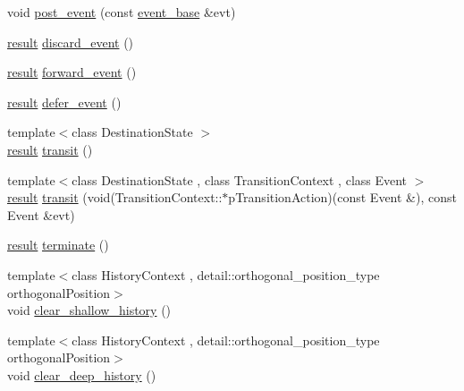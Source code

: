 \begin{DoxyCompactItemize}
\item 
void \mbox{\hyperlink{classboost_1_1statechart_1_1simple__state_aeea3396289a32b467dd094d2c7965f23}{post\+\_\+event}} (const \mbox{\hyperlink{classboost_1_1statechart_1_1event__base}{event\+\_\+base}} \&evt)
\item 
\mbox{\hyperlink{namespaceboost_1_1statechart_abe807f6598b614d6d87bb951ecd92331}{result}} \mbox{\hyperlink{classboost_1_1statechart_1_1simple__state_aba633726b29a7bd07d69429bab4a3a1b}{discard\+\_\+event}} ()
\item 
\mbox{\hyperlink{namespaceboost_1_1statechart_abe807f6598b614d6d87bb951ecd92331}{result}} \mbox{\hyperlink{classboost_1_1statechart_1_1simple__state_a9892a580bc7f9b502e5c01970bff17cf}{forward\+\_\+event}} ()
\item 
\mbox{\hyperlink{namespaceboost_1_1statechart_abe807f6598b614d6d87bb951ecd92331}{result}} \mbox{\hyperlink{classboost_1_1statechart_1_1simple__state_aa2d6f620620d43f7db68baa9ed638b80}{defer\+\_\+event}} ()
\item 
{\footnotesize template$<$class Destination\+State $>$ }\\\mbox{\hyperlink{namespaceboost_1_1statechart_abe807f6598b614d6d87bb951ecd92331}{result}} \mbox{\hyperlink{classboost_1_1statechart_1_1simple__state_aa0865d4f3f3763e77dfd86f70aa558af}{transit}} ()
\item 
{\footnotesize template$<$class Destination\+State , class Transition\+Context , class Event $>$ }\\\mbox{\hyperlink{namespaceboost_1_1statechart_abe807f6598b614d6d87bb951ecd92331}{result}} \mbox{\hyperlink{classboost_1_1statechart_1_1simple__state_a8afd3e06eb91829a43bc82031c848fb1}{transit}} (void(Transition\+Context\+::$\ast$p\+Transition\+Action)(const Event \&), const Event \&evt)
\item 
\mbox{\hyperlink{namespaceboost_1_1statechart_abe807f6598b614d6d87bb951ecd92331}{result}} \mbox{\hyperlink{classboost_1_1statechart_1_1simple__state_af1b306e54db708323280093a4452da13}{terminate}} ()
\item 
{\footnotesize template$<$class History\+Context , detail\+::orthogonal\+\_\+position\+\_\+type orthogonal\+Position$>$ }\\void \mbox{\hyperlink{classboost_1_1statechart_1_1simple__state_a6a338130243f1ad8fa655e4dd3e57ca2}{clear\+\_\+shallow\+\_\+history}} ()
\item 
{\footnotesize template$<$class History\+Context , detail\+::orthogonal\+\_\+position\+\_\+type orthogonal\+Position$>$ }\\void \mbox{\hyperlink{classboost_1_1statechart_1_1simple__state_a23ca1de9d37765cf77884222e0491a5e}{clear\+\_\+deep\+\_\+history}} ()

\end{DoxyCompactItemize}
